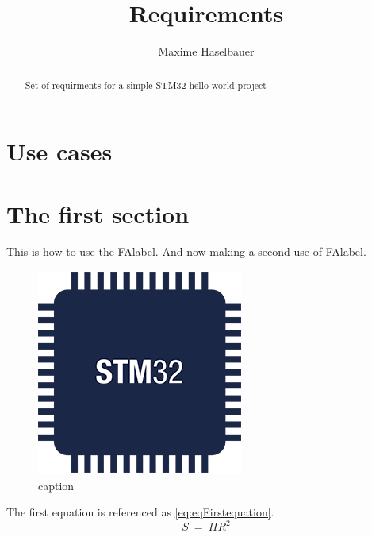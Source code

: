 \documentclass[a4paper,10pt]{article}
\title{Requirements}
\author{Maxime Haselbauer}
\begin{document}
\maketitle
\begin{abstract}
Set of requirments for a simple STM32 hello world project
\end{abstract}
\printnomenclature
\printglossaries



\section{Use cases}


\section{The first section}
This is how to use the \gls{FAlabel}. And now making a second use of \gls{FAlabel}.
\cite{fooAuthor}

\begin{figure}[ht]
	\centering
	\includegraphics[width=0.75 \textwidth]{../resources/project_logo.png}
	\caption{caption}
	\label{reference}
\end{figure}

The first equation is referenced as \ref{eq:eqFirstequation}.
\begin{equation}
S~=~\Pi R^2
\label{eq:eqFirstequation}
\end{equation}

\printbibliography
\end{document}
